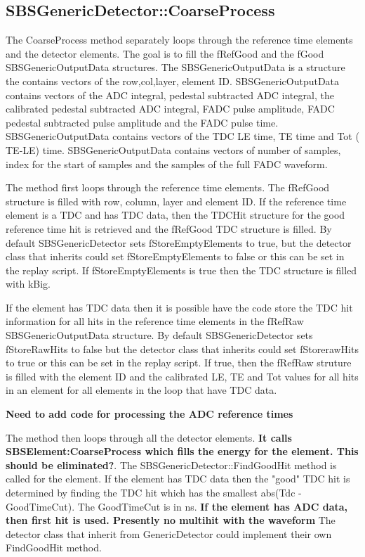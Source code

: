 \documentclass[11pt]{article}
\begin{document}
\subsection{SBSGenericDetector::CoarseProcess}
The CoarseProcess method separately loops through the reference time elements and the detector elements.
The goal is to fill the fRefGood and the fGood SBSGenericOutputData structures. The
SBSGenericOutputData is a structure the contains vectors of the row,col,layer, element ID.
SBSGenericOutputData contains vectors of the ADC integral, pedestal subtracted ADC integral, 
the calibrated   pedestal subtracted ADC integral, FADC pulse amplitude, FADC pedestal subtracted pulse amplitude
and the FADC pulse time. SBSGenericOutputData contains vectors of the TDC LE time, TE time and Tot ( TE-LE) time.
 SBSGenericOutputData contains vectors of  number of samples, index for the start of 
 samples and the samples of the full FADC waveform.
 
 The method first loops through the reference time elements. The fRefGood structure 
 is filled with row, column, layer and element ID. If the reference time element is
 a TDC and has TDC data, then the TDCHit structure for the good reference time hit is retrieved
 and the fRefGood TDC structure is filled.
 By default SBSGenericDetector sets fStoreEmptyElements to true, but the detector class that inherits 
 could set  fStoreEmptyElements to false or this can be set in the replay script.
  If  fStoreEmptyElements is true then the TDC structure is filled with kBig.
 
If the element has TDC data then it is possible have the code store the TDC hit information for
all hits in the reference time elements in the fRefRaw SBSGenericOutputData structure.
 By default SBSGenericDetector sets fStoreRawHits to false but the detector class that inherits 
 could set  fStorerawHits to true or this can be set in the replay script.
 If true, then the fRefRaw struture is filled with the element ID and the calibrated LE, TE and Tot values
 for all hits in an element for all elements in the loop that have TDC data.
 
 {\bf Need to add code for processing the ADC reference times}
 
 The method then loops through all the detector elements. {\bf It calls SBSElement:CoarseProcess which fills
 the energy for the element. This should be eliminated?}.
The SBSGenericDetector::FindGoodHit method is called for the element. If the element has TDC data
then the "good" TDC hit is determined by finding the TDC hit which has the smallest abs(Tdc -GoodTimeCut). The GoodTimeCut is in ns. {\bf If the element has ADC data, then first hit is used. Presently no multihit with
the waveform} The detector class that inherit from GenericDetector could implement their own FindGoodHit method.
\end{document}
